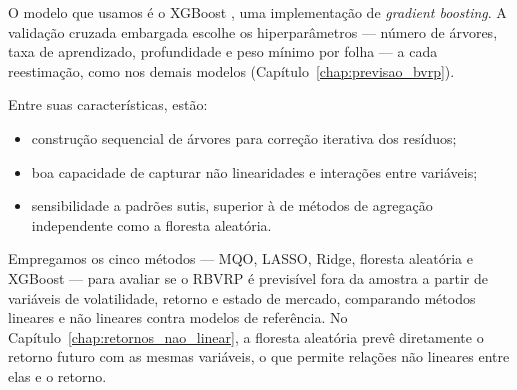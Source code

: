 O modelo que usamos é o XGBoost \citep{chen2016xgboost}, uma
implementação de \textit{gradient boosting}. A validação cruzada embargada
escolhe os hiperparâmetros --- número de árvores, taxa de aprendizado,
profundidade e peso mínimo por folha --- a cada reestimação, como nos demais
modelos (Capítulo~\ref{chap:previsao_bvrp}).

Entre suas características, estão:

\begin{itemize}
    \item construção sequencial de árvores para correção iterativa dos resíduos;
    \item boa capacidade de capturar não linearidades e interações entre
          variáveis;
    \item sensibilidade a padrões sutis, superior à de métodos de agregação
          independente como a floresta aleatória.
\end{itemize}

Empregamos os cinco métodos --- MQO, LASSO, Ridge, floresta
aleatória e XGBoost --- para avaliar se o
RBVRP é previsível fora da amostra a partir de variáveis de volatilidade, retorno
e estado de mercado, comparando métodos lineares e não lineares contra
modelos de referência. No Capítulo~\ref{chap:retornos_nao_linear}, a floresta
aleatória prevê diretamente o retorno futuro com as mesmas variáveis, o que
permite relações não lineares entre elas e o retorno.
